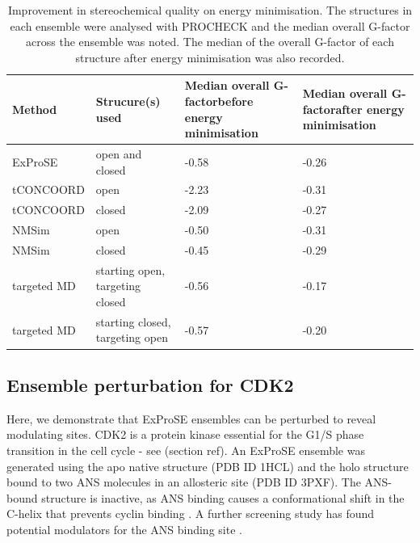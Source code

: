 \begin{table}
\centering

\begin{scriptsize}
\begin{tabular}{ l l p{4cm} p{4cm} }
\hline
\textbf{Method} & \textbf{Strucure(s) used} & \textbf{Median overall G-factor\newline before energy minimisation} & \textbf{Median overall G-factor\newline after energy minimisation} \\
\hline
ExProSE     & open and closed                 & -0.58 & -0.26 \\
tCONCOORD   & open                            & -2.23 & -0.31 \\
tCONCOORD   & closed                          & -2.09 & -0.27 \\
NMSim       & open                            & -0.50 & -0.31 \\
NMSim       & closed                          & -0.45 & -0.29 \\
targeted MD & starting open, targeting closed & -0.56 & -0.17 \\
targeted MD & starting closed, targeting open & -0.57 & -0.20 \\
\hline
\end{tabular}
\end{scriptsize}

\caption{Improvement in stereochemical quality on energy minimisation.
The structures in each ensemble were analysed with PROCHECK and the median overall G-factor across the ensemble was noted.
The median of the overall G-factor of each structure after energy minimisation was also recorded.}

\label{tab:energy_minimisation}
\end{table}


\subsection{Ensemble perturbation for CDK2}

Here, we demonstrate that ExProSE ensembles can be perturbed to reveal modulating sites.
CDK2 is a protein kinase essential for the G1/S phase transition in the cell cycle - see (section ref).
An ExProSE ensemble was generated using the apo native structure (PDB ID 1HCL) and the holo structure bound to two ANS molecules in an allosteric site (PDB ID 3PXF).
The ANS-bound structure is inactive, as ANS binding causes a conformational shift in the C-helix that prevents cyclin binding \cite{Betzi2011}.
A further screening study has found potential modulators for the ANS binding site \cite{Rastelli2014}.

